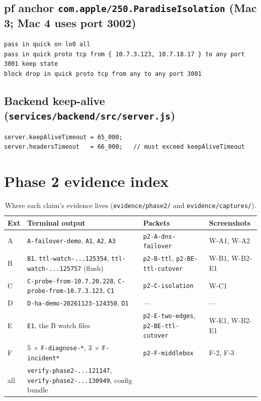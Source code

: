 \documentclass[11pt,a4paper]{article}
\begin{document}
\subsection{pf anchor \texttt{com.apple/250.ParadiseIsolation} (Mac 3; Mac 4 uses port 3002)}
\par\noindent\begin{minipage}{\linewidth}
\begin{lstlisting}
pass in quick on lo0 all
pass in quick proto tcp from { 10.7.3.123, 10.7.18.17 } to any port 3001 keep state
block drop in quick proto tcp from any to any port 3001
\end{lstlisting}
\end{minipage}\par

\subsection{Backend keep-alive (\texttt{services/backend/src/server.js})}
\par\noindent\begin{minipage}{\linewidth}
\begin{lstlisting}
server.keepAliveTimeout = 65_000;
server.headersTimeout   = 66_000;   // must exceed keepAliveTimeout
\end{lstlisting}
\end{minipage}\par

\section{Phase 2 evidence index}
\begin{table}[H]
\centering
\caption{Where each claim's evidence lives (\texttt{evidence/phase2/} and \texttt{evidence/captures/}).}
{\small
\begin{tabular}{@{}L{0.9cm}L{6.6cm}L{3.6cm}L{2.8cm}@{}}
\toprule
\textbf{Ext} & \textbf{Terminal output} & \textbf{Packets} & \textbf{Screenshots} \\
\midrule
A & \texttt{A-failover-demo}, \texttt{A1}, \texttt{A2}, \texttt{A3} & \texttt{p2-A-dns-failover} & W-A1, W-A2 \\
B & \texttt{B1}, \texttt{ttl-watch-...125354}, \texttt{ttl-watch-...125757} (flush) & \texttt{p2-B-ttl}, \texttt{p2-BE-ttl-cutover} & W-B1, W-B2-E1 \\
C & \texttt{C-probe-from-10.7.20.228}, \texttt{C-probe-from-10.7.3.123}, \texttt{C1} & \texttt{p2-C-isolation} & W-C1 \\
D & \texttt{D-ha-demo-20261123-124350}, \texttt{D1} & --- & --- \\
E & \texttt{E1}, the B watch files & \texttt{p2-E-two-edges}, \texttt{p2-BE-ttl-cutover} & W-E1, W-B2-E1 \\
F & 5 $\times$ \texttt{F-diagnose-*}, 3 $\times$ \texttt{F-incident*} & \texttt{p2-F-middlebox} & F-2, F-3 \\
all & \texttt{verify-phase2-...121147}, \texttt{verify-phase2-...130949}, config bundle & & \\
\bottomrule
\end{tabular}}
\end{table}
\end{document}
